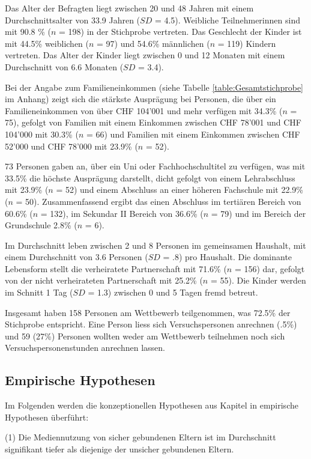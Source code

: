Das Alter der Befragten liegt zwischen 20 und 48 Jahren mit einem Durchschnittsalter von 33.9 Jahren ($SD$ = 4.5). Weibliche Teilnehmerinnen sind mit 90.8 \% ($n$ = 198) in der Stichprobe vertreten. Das Geschlecht der Kinder ist mit 44.5\% weiblichen ($n$ = 97) und 54.6\% männlichen ($n$ = 119) Kindern vertreten. Das Alter der Kinder liegt zwischen 0 und 12 Monaten mit einem Durchschnitt von 6.6 Monaten ($SD$ = 3.4).

Bei der Angabe zum Familieneinkommen (siehe Tabelle \ref{table:Gesamtstichprobe} im Anhang) zeigt sich die stärkste Ausprägung bei Personen, die über ein Familieneinkommen von über CHF 104'001 und mehr verfügen mit 34.3\% ($n$ = 75), gefolgt von Familien mit einem Einkommen zwischen CHF 78'001 und CHF 104'000 mit 30.3\% ($n$ = 66) und Familien mit einem Einkommen zwischen CHF 52'000 und CHF 78'000 mit 23.9\% ($n$ = 52). 

73 Personen gaben an, über ein Uni oder Fachhochschultitel zu verfügen, was mit 33.5\% die höchste Ausprägung darstellt, dicht gefolgt von einem Lehrabschluss mit 23.9\% ($n$ = 52) und einem Abschluss an einer höheren Fachschule mit 22.9\% ($n$ = 50). Zusammenfassend ergibt das einen Abschluss im tertiären Bereich von 60.6\% ($n$ = 132), im Sekundar II Bereich von 36.6\% ($n$ = 79) und im Bereich der Grundschule 2.8\% ($n$ = 6).

Im Durchschnitt leben zwischen 2 und 8 Personen im gemeinsamen Haushalt, mit einem Durchschnitt von 3.6 Personen ($SD$ = .8) pro Haushalt. Die dominante Lebensform stellt die verheiratete Partnerschaft mit 71.6\% ($n$ = 156) dar, gefolgt von der nicht verheirateten Partnerschaft mit 25.2\% ($n$ = 55). Die Kinder werden im Schnitt 1 Tag ($SD$ = 1.3)  zwischen 0 und 5 Tagen fremd betreut.

Insgesamt haben 158 Personen am Wettbewerb teilgenommen, was 72.5\% der Stichprobe entspricht. Eine Person liess sich Versuchspersonen anrechnen (.5\%) und 59 (27\%) Personen wollten weder am Wettbewerb teilnehmen noch sich Versuchspersonenstunden anrechnen lassen.



\subsection{Empirische Hypothesen}\label{sec:EmpirischeHypothesen}
Im Folgenden werden die konzeptionellen Hypothesen aus Kapitel \textit{} in empirische Hypothesen überführt:

(1) Die Mediennutzung von sicher gebundenen Eltern ist im Durchschnitt signifikant tiefer als diejenige der unsicher gebundenen Eltern.

